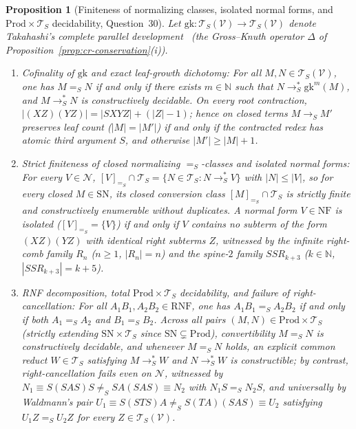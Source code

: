 \documentclass[11pt,reqno]{amsart}
\numberwithin{equation}{section}
\theoremstyle{plain}
\newtheorem{proposition}[theorem]{Proposition}
\theoremstyle{definition}
\theoremstyle{remark}
\newcommand{\TS}{\mathcal{T}_S}
\newcommand{\TSV}{\mathcal{T}_S(\mathcal{V})}
\newcommand{\NF}{\mathrm{NF}}
\newcommand{\RNF}{\mathrm{RNF}}
\newcommand{\SN}{\mathrm{SN}}
\newcommand{\Prod}{\mathrm{Prod}}
\newcommand{\redS}{\to_S}
\newcommand{\redSs}{\to_S^*}
\newcommand{\convS}{=_S}
\begin{document}
\begin{proposition}[Finiteness of normalizing classes, isolated normal forms, and $\Prod \times \TS$ decidability, Question~30]\label{prop:q30-decidability}
Let $\mathrm{gk} \colon \TSV \to \TSV$ denote Takahashi's complete parallel development~\cite{Takahashi1995} (the Gross--Knuth operator $\Delta$ of Proposition~\ref{prop:cr-conservation}(i)).
\begin{enumerate}[label=(\roman*),leftmargin=2.2em]
  \item \emph{Cofinality of $\mathrm{gk}$ and exact leaf-growth dichotomy:} For all $M, N \in \TSV$, one has $M \convS N$ if and only if there exists $m \in \mathbb{N}$ such that $N \redSs \mathrm{gk}^m(M)$, and $M \redSs N$ is constructively decidable. On every root contraction, $|(X Z)(Y Z)| = |S X Y Z| + (|Z| - 1)$; hence on closed terms $M \redS M'$ preserves leaf count ($|M| = |M'|$) if and only if the contracted redex has atomic third argument $S$, and otherwise $|M'| \ge |M| + 1$.
  \item \emph{Strict finiteness of closed normalizing $\convS$-classes and isolated normal forms:} For every $V \in \mathcal{N}$, $[V]_{\convS} \cap \TS = \{ N \in \TS : N \redSs V \}$ with $|N| \le |V|$, so for every closed $M \in \SN$, its closed conversion class $[M]_{\convS} \cap \TS$ is strictly finite and constructively enumerable without duplicates. A normal form $V \in \NF$ is isolated ($[V]_{\convS} = \{V\}$) if and only if $V$ contains no subterm of the form $(X Z)(Y Z)$ with identical right subterms $Z$, witnessed by the infinite right-comb family $R_n$ ($n \ge 1$, $|R_n| = n$) and the spine-$2$ family $S S R_{k+3}$ ($k \in \mathbb{N}$, $|S S R_{k+3}| = k + 5$).
  \item \emph{RNF decomposition, total $\Prod \times \TS$ decidability, and failure of right-cancellation:} For all $A_1 B_1, A_2 B_2 \in \RNF$, one has $A_1 B_1 \convS A_2 B_2$ if and only if both $A_1 \convS A_2$ and $B_1 \convS B_2$. Across all pairs $(M, N) \in \Prod \times \TS$ (strictly extending $\SN \times \TS$ since $\SN \subsetneq \Prod$), convertibility $M \convS N$ is constructively decidable, and whenever $M \convS N$ holds, an explicit common reduct $W \in \TS$ satisfying $M \redSs W$ and $N \redSs W$ is constructible; by contrast, right-cancellation fails even on $\mathcal{N}$, witnessed by $N_1 \equiv S(S A S)S \neq_S S A (S A S) \equiv N_2$ with $N_1 S \convS N_2 S$, and universally by Waldmann's pair $U_1 \equiv S(S T S)A \neq_S S(T A)(S A S) \equiv U_2$ satisfying $U_1 Z \convS U_2 Z$ for every $Z \in \TSV$.
\end{enumerate}
\end{proposition}
\end{document}
